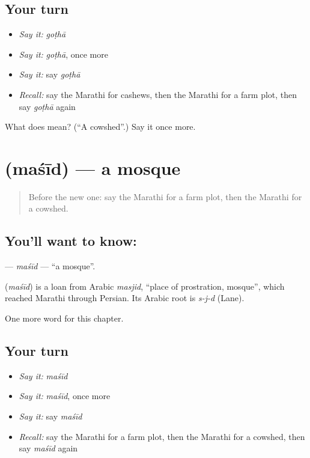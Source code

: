 \subsection*{Your turn}
\begin{itemize}
\raggedright
  \item \emph{Say it:} \emph{goṭhā}
  \item \emph{Say it:} \emph{goṭhā}, once more
  \item \emph{Say it:} say \emph{goṭhā}
  \item \emph{Recall:} say the Marathi for cashews, then the Marathi for a farm plot, then say \emph{goṭhā} again
\end{itemize}

\begin{tcolorbox}[breakable,colback=teal!4,colframe=teal!35!black,title={Before you move on}]
What does  mean? (\textquotedblleft{}A cowshed\textquotedblright{}.) Say it once more.
\end{tcolorbox}
\section[\texorpdfstring{\mr{मशीद} (maśīd)}{मशीद (maśīd)}]{ (maśīd) — a mosque}

\label{lesson:MR-C245-masid}



\begin{quote}
Before the new one: say the Marathi for a farm plot, then the Marathi for a cowshed.
\end{quote}

\subsection*{You'll want to know: }
\textbf{} — \emph{maśīd} — \textquotedblleft{}a mosque\textquotedblright{}.

\begin{cousinweb}
\textbf{} (\emph{maśīd}) is a loan from Arabic \emph{masjid}, \textquotedblleft{}place of prostration, mosque\textquotedblright{}, which reached Marathi through Persian. Its Arabic root is \emph{s-j-d} (Lane).
\end{cousinweb}

\begin{grammarlens}[title={What you've built}]
One more word for this chapter.
\end{grammarlens}

\subsection*{Your turn}
\begin{itemize}
\raggedright
  \item \emph{Say it:} \emph{maśīd}
  \item \emph{Say it:} \emph{maśīd}, once more
  \item \emph{Say it:} say \emph{maśīd}
  \item \emph{Recall:} say the Marathi for a farm plot, then the Marathi for a cowshed, then say \emph{maśīd} again
\end{itemize}

